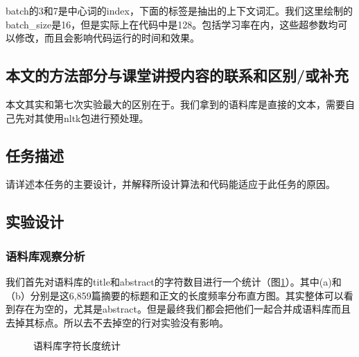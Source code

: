 \documentclass{article}
\begin{document}
batch的3和7是中心词的index，下面的标签是抽出的上下文词汇。我们这里绘制的batch\_size是16，但是实际上在代码中是128。包括学习率在内，这些超参数均可以修改，而且会影响代码运行的时间和效果。

\subsection{本文的方法部分与课堂讲授内容的联系和区别/或补充}

本文其实和第七次实验最大的区别在于。我们拿到的语料库是直接的文本，需要自己先对其使用nltk包进行预处理。
\subsection{任务描述}

请详述本任务的主要设计，并解释所设计算法和代码能适应于此任务的原因。


\subsection{实验设计}
\subsubsection{语料库观察分析}
我们首先对语料库的title和abstract的字符数目进行一个统计（图\ref{zczxzx1}）。其中(a)和（b）分别是这6,859篇摘要的标题和正文的长度频率分布直方图。其实整体可以看到存在为空的，尤其是abstract。但是最终我们都会把他们一起合并成语料库而且去掉其标点。所以去不去掉空的行对实验没有影响。
 \begin{figure}[H]
  \centering
  \caption{语料库字符长度统计}
  \label{zczxzx1}
\end{figure}
\end{document}

